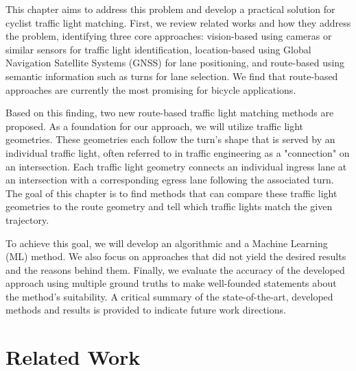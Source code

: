 This chapter aims to address this problem and develop a practical solution for cyclist traffic light matching. First, we review related works and how they address the problem, identifying three core approaches: vision-based using cameras or similar sensors for traffic light identification, location-based using Global Navigation Satellite Systems (GNSS) for lane positioning, and route-based using semantic information such as turns for lane selection. We find that route-based approaches are currently the most promising for bicycle applications. 

Based on this finding, two new route-based traffic light matching methods are proposed. As a foundation for our approach, we will utilize traffic light geometries. These geometries each follow the turn's shape that is served by an individual traffic light, often referred to in traffic engineering as a "connection" on an intersection. Each traffic light geometry connects an individual ingress lane at an intersection with a corresponding egress lane following the associated turn. The goal of this chapter is to find methods that can compare these traffic light geometries to the route geometry and tell which traffic lights match the given trajectory.

To achieve this goal, we will develop an algorithmic and a Machine Learning (ML) method. We also focus on approaches that did not yield the desired results and the reasons behind them. Finally, we evaluate the accuracy of the developed approach using multiple ground truths to make well-founded statements about the method's suitability. A critical summary of the state-of-the-art, developed methods and results is provided to indicate future work directions.

\section{Related Work}

